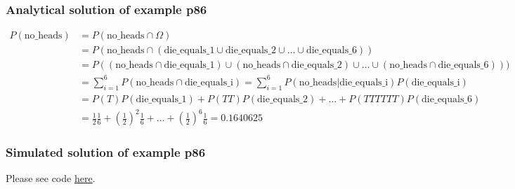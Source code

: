 \begin{frame}
    \frametitle{Analytical solution of example p86}
    \tiny
    \begin{align*}
        P(\text{no\_heads})&=P(\text{no\_heads}\cap\Omega)\\
                           &=P(\text{no\_heads}\cap\left(\text{die\_equals\_1}\cup\text{die\_equals\_2}\cup\dots\cup\text{die\_equals\_6}\right))\\
                           &=P((\text{no\_heads}\cap\text{die\_equals\_1})\cup (\text{no\_heads}\cap\text{die\_equals\_2})\cup\ldots\cup (\text{no\_heads}\cap\text{die\_equals\_6})))\\
                           &=\sum_{i=1}^6P(\text{no\_heads}\cap\text{die\_equals\_i})=\sum_{i=1}^6P(\text{no\_heads}|\text{die\_equals\_i})P(\text{die\_equals\_i})\\
                           &=P(T)P(\text{die\_equals\_1})+
                           P(TT)P(\text{die\_equals\_2})+\ldots +
                           P(TTTTTT)P(\text{die\_equals\_6})\\
                           &=\frac{1}{2}\frac{1}{6}+\left(\frac{1}{2}\right)^2\frac{1}{6}+\ldots+\left(\frac{1}{2}\right)^6\frac{1}{6}=0.1640625
    \end{align*}
    \normalsize

\end{frame}

\begin{frame}[fragile]
    \frametitle{Simulated solution of example p86}

    Please see code \href{https://joacorapela.github.io/gcnuBridging2023/auto_examples/foundations/plot_exampleP86.html#sphx-glr-auto-examples-foundations-plot-examplep86-py}{here}.

\end{frame}

